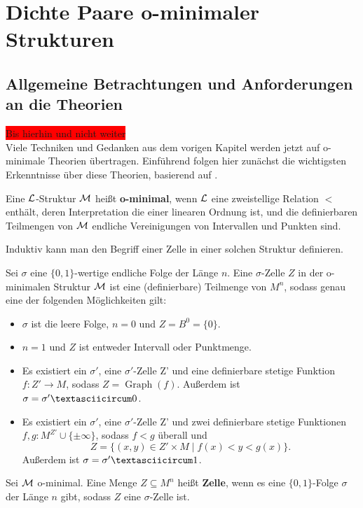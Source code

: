 \chapter{Dichte Paare o-minimaler Strukturen}
\section{Allgemeine Betrachtungen und Anforderungen an die Theorien}
\colorbox{red}{Bis hierhin und nicht weiter}\\
Viele Techniken und Gedanken aus dem vorigen Kapitel werden jetzt auf o-minimale Theorien übertragen. Einführend folgen hier zunächst die wichtigsten Erkenntnisse über diese Theorien, basierend auf \cite{vdDZellzerlegung}.

\begin{definition}
	Eine $\mathcal{L}$-Struktur $\mathcal{M}$ heißt \textbf{o-minimal}, wenn $\mathcal{L}$ eine zweistellige Relation $<$ enthält, deren Interpretation die einer linearen Ordnung ist, und die definierbaren Teilmengen von $\mathcal{M}$ endliche Vereinigungen von Intervallen und Punkten sind.
\end{definition}

Induktiv kann man den Begriff einer Zelle in einer solchen Struktur definieren.
\begin{definition}
	Sei $\sigma$ eine $\{0,1\}$-wertige endliche Folge der Länge $n$. Eine $\sigma$-Zelle $Z$ in der o-minimalen Struktur $\mathcal{M}$ ist eine (definierbare) Teilmenge von $M^n$, sodass genau eine der folgenden Möglichkeiten gilt:
	\begin{itemize}
		\item $\sigma$ ist die leere Folge, $n=0$ und $Z=B^0=\{0\}$.
		\item $n=1$ und $Z$ ist entweder Intervall oder Punktmenge.
		\item Es existiert ein $\sigma'$, eine $\sigma'$-Zelle Z' und eine definierbare stetige Funktion $f:Z'\rightarrow M$, sodass $Z=\operatorname{Graph}(f)$. Außerdem ist $\sigma=\sigma'\textasciicircum0$.
		\item Es existiert ein $\sigma'$, eine $\sigma'$-Zelle Z' und zwei definierbare stetige Funktionen $f,g:M^{Z'}\cup\{\pm\infty\}$, sodass $f<g$ überall und $$Z=\{(x,y)\in Z'\times M\mid f(x)<y<g(x)\}.$$ Außerdem ist $\sigma=\sigma'\textasciicircum1$.
	\end{itemize}
\end{definition}
\begin{definition}
	Sei $\mathcal{M}$ o-minimal. Eine Menge $Z\subseteq M^n$ heißt \textbf{Zelle}, wenn es eine $\{0,1\}$-Folge $\sigma$ der Länge $n$ gibt, sodass $Z$ eine $\sigma$-Zelle ist.
\end{definition}

